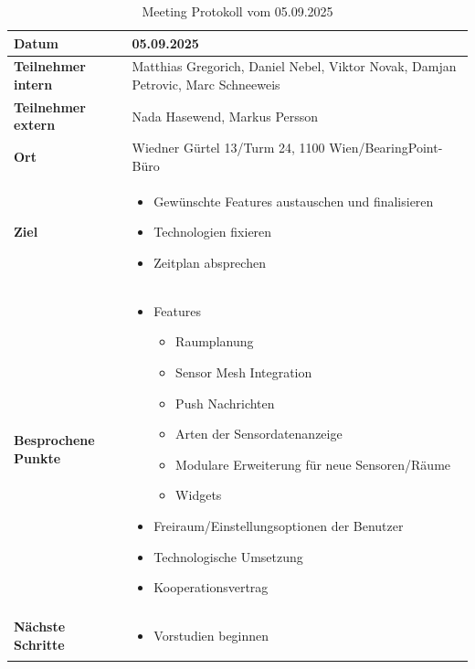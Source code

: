\documentclass{article}
\begin{document}
\begin{table}[htbp]
  \centering
  \begin{tabularx}{\textwidth}{|>{\columncolor{black!10}}l|X|}
    \hline
    \textbf{Datum} & 05.09.2025 \\
    \hline
    \textbf{Teilnehmer intern} & Matthias Gregorich, Daniel Nebel, Viktor Novak, Damjan Petrovic, Marc Schneeweis \\ 
    \hline
    \textbf{Teilnehmer extern} & Nada Hasewend, Markus Persson \\
    \hline
    \textbf{Ort} & Wiedner Gürtel 13/Turm 24, 1100 Wien/BearingPoint-Büro \\ 
    \hline
    \textbf{Ziel} &
    \vspace{-0.5em}
    \begin{itemize}
        \item Gewünschte Features austauschen und finalisieren
        \item Technologien fixieren
        \item Zeitplan absprechen
    \end{itemize} \\
    \hline
    \textbf{Besprochene Punkte} &
    \vspace{-0.5em}
    \begin{itemize}
        \item Features
          \begin{itemize}[label=-,leftmargin=1.2em,nosep,topsep=0pt]
            \item Raumplanung
            \item Sensor Mesh Integration
            \item Push Nachrichten
            \item Arten der Sensordatenanzeige
            \item Modulare Erweiterung für neue Sensoren/Räume
            \item Widgets
          \end{itemize}
        \item Freiraum/Einstellungsoptionen der Benutzer
        \item Technologische Umsetzung
        \item Kooperationsvertrag
    \end{itemize} \\
    \hline
    \textbf{Nächste Schritte} &
    \vspace{-0.5em}
    \begin{itemize}
        \item Vorstudien beginnen 
    \end{itemize} \\
    \hline
  \end{tabularx}
  \caption{Meeting Protokoll vom 05.09.2025}
  \label{tab:meeting-05-09-2025}
\end{table}
\end{document}
